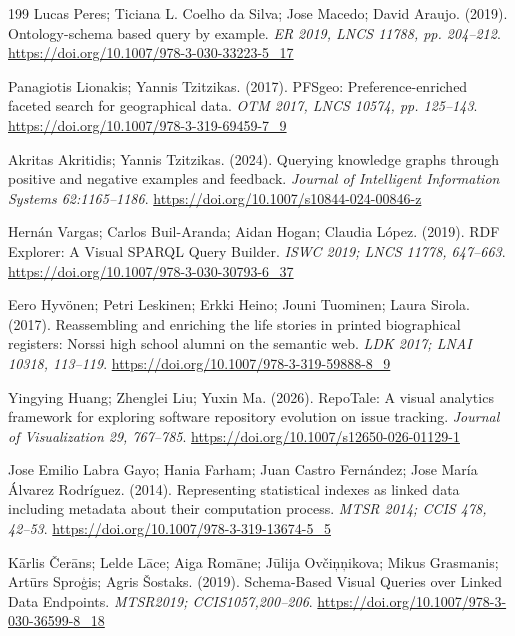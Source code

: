 \documentclass[manuscript,review,screen]{acmart}
\begin{document}
\begin{thebibliography}{199}
 Lucas Peres; Ticiana L. Coelho da Silva; Jose Macedo; David Araujo. (2019). Ontology-schema based query by example. \textit{ER 2019, LNCS 11788, pp. 204--212}. \url{https://doi.org/10.1007/978-3-030-33223-5_17}

 Panagiotis Lionakis; Yannis Tzitzikas. (2017). PFSgeo: Preference-enriched faceted search for geographical data. \textit{OTM 2017, LNCS 10574, pp. 125--143}. \url{https://doi.org/10.1007/978-3-319-69459-7_9}

 Akritas Akritidis; Yannis Tzitzikas. (2024). Querying knowledge graphs through positive and negative examples and feedback. \textit{Journal of Intelligent Information Systems 62:1165--1186}. \url{https://doi.org/10.1007/s10844-024-00846-z}

 Hern\'{a}n Vargas; Carlos Buil-Aranda; Aidan Hogan; Claudia L\'{o}pez. (2019). RDF Explorer: A Visual SPARQL Query Builder. \textit{ISWC 2019; LNCS 11778, 647--663}. \url{https://doi.org/10.1007/978-3-030-30793-6_37}

 Eero Hyv\"{o}nen; Petri Leskinen; Erkki Heino; Jouni Tuominen; Laura Sirola. (2017). Reassembling and enriching the life stories in printed biographical registers: Norssi high school alumni on the semantic web. \textit{LDK 2017; LNAI 10318, 113--119}. \url{https://doi.org/10.1007/978-3-319-59888-8_9}

 Yingying Huang; Zhenglei Liu; Yuxin Ma. (2026). RepoTale: A visual analytics framework for exploring software repository evolution on issue tracking. \textit{Journal of Visualization 29, 767--785}. \url{https://doi.org/10.1007/s12650-026-01129-1}

 Jose Emilio Labra Gayo; Hania Farham; Juan Castro Fern\'{a}ndez; Jose Mar\'{i}a \'{A}lvarez Rodr\'{i}guez. (2014). Representing statistical indexes as linked data including metadata about their computation process. \textit{MTSR 2014; CCIS 478, 42--53}. \url{https://doi.org/10.1007/978-3-319-13674-5_5}

 K\={a}rlis \v{C}er\={a}ns; Lelde L\={a}ce; Aiga Rom\={a}ne; J\={u}lija Ov\v{c}i\c{n}\c{n}ikova; Mikus Grasmanis; Art\={u}rs Spro\c{g}is; Agris \v{S}ostaks. (2019). Schema-Based Visual Queries over Linked Data Endpoints. \textit{MTSR2019; CCIS1057,200--206}. \url{https://doi.org/10.1007/978-3-030-36599-8_18}


\end{thebibliography}
\end{document}
